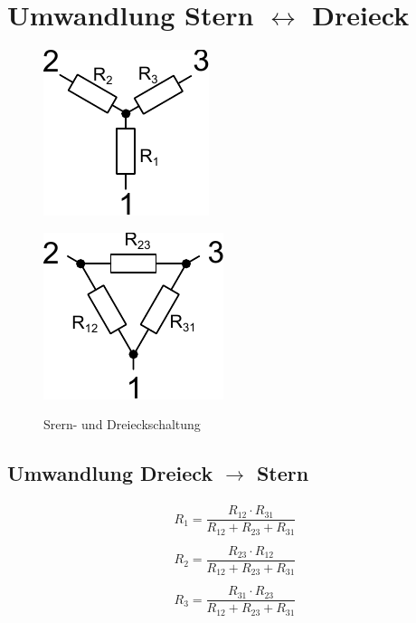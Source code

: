 



\section{Umwandlung Stern $\leftrightarrow$ Dreieck}
\begin{figure}[h!]
\centering
\includegraphics[scale=\schscale]{star_sch.pdf}

\vspace{5mm}

\includegraphics[scale=\schscale]{tri_sch.pdf}
\label{sch:tristar}
\caption{Srern- und Dreieckschaltung}
\end{figure}

\subsection{Umwandlung Dreieck $\to$ Stern}
\[ \begin{matrix}
R_1 = \dfrac{R_{12} \cdot R_{31}}{R_{12} + R_{23} + R_{31}}\\\\
R_2 = \dfrac{R_{23} \cdot R_{12}}{R_{12} + R_{23} + R_{31}}\\\\
R_3 = \dfrac{R_{31} \cdot R_{23}}{R_{12} + R_{23} + R_{31}}\\\\
\end{matrix} \]


